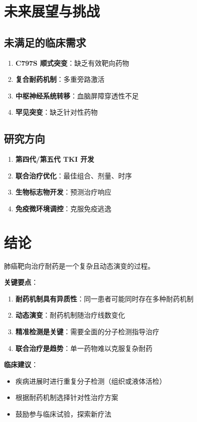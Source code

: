 \documentclass[12pt,a4paper]{article}
\begin{document}
\section{未来展望与挑战}

\subsection{未满足的临床需求}

\begin{enumerate}
    \item \textbf{C797S 顺式突变}：缺乏有效靶向药物
    \item \textbf{复合耐药机制}：多重旁路激活
    \item \textbf{中枢神经系统转移}：血脑屏障穿透性不足
    \item \textbf{罕见突变}：缺乏针对性药物
\end{enumerate}

\subsection{研究方向}

\begin{enumerate}
    \item \textbf{第四代/第五代 TKI 开发}
    \item \textbf{联合治疗优化}：最佳组合、剂量、时序
    \item \textbf{生物标志物开发}：预测治疗响应
    \item \textbf{免疫微环境调控}：克服免疫逃逸
\end{enumerate}

\section{结论}

肺癌靶向治疗耐药是一个复杂且动态演变的过程。

\textbf{关键要点}：
\begin{enumerate}
    \item \textbf{耐药机制具有异质性}：同一患者可能同时存在多种耐药机制
    \item \textbf{动态演变}：耐药机制随治疗线数变化
    \item \textbf{精准检测是关键}：需要全面的分子检测指导治疗
    \item \textbf{联合治疗是趋势}：单一药物难以克服复杂耐药
\end{enumerate}

\textbf{临床建议}：
\begin{itemize}
    \item 疾病进展时进行重复分子检测（组织或液体活检）
    \item 根据耐药机制选择针对性治疗方案
    \item 鼓励参与临床试验，探索新疗法
\end{itemize}

\newpage


\end{document}
